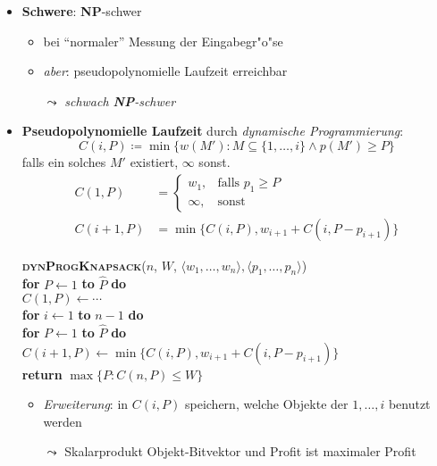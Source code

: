 \begin{itemize}
\begin{center}
  \end{center}
  \item \textbf{Schwere}: \textbf{NP}-schwer
  \begin{itemize}
    \item bei ``normaler'' Messung der Eingabegr"o"se
    \item \emph{aber}: pseudopolynomielle Laufzeit erreichbar
    \item[$ \leadsto $] \emph{schwach \textbf{NP}-schwer}
  \end{itemize}
  \item \textbf{Pseudopolynomielle Laufzeit} durch \emph{dynamische Programmierung}:
  \begin{equation*}
    C(i,P) \coloneqq \min\{ w(M') : M \subseteq \{ 1, \dots, i \} \wedge p(M') \geq P \}
  \end{equation*}
  falls ein solches $ M' $ existiert, $ \infty $ sonst.
  \begin{align*}
    C(1,P) &= \begin{cases}
      w_1, &\text{falls } p_1 \geq P \\
      \infty, &\text{sonst}
    \end{cases} \\
    C(i+1, P) &= \min\{ C(i,P), w_{i+1}+C(i,P-p_{i+1}) \}
  \end{align*}
  \begin{pseudocode}
    \textsc{\textbf{dynProgKnapsack}}($ n $, $ W $, $ \langle w_1, \dots, w_n \rangle, \langle p_1, \dots, p_n \rangle $) \\
    \textbf{for} $ P \leftarrow 1 $ \textbf{to} $ \hat{P} $ \textbf{do} \\
    \phantom{\quad} $ C(1,P) \leftarrow \cdots $ \\
    \textbf{for} $ i \leftarrow 1 $ \textbf{to} $ n - 1 $ \textbf{do} \\
    \phantom{\quad} \textbf{for} $ P \leftarrow 1 $ \textbf{to} $ \hat{P} $ \textbf{do} \\
    \phantom{\quad} \phantom{\quad} $ C(i+1, P) \leftarrow \min\{ C(i,P), w_{i+1}+C(i,P-p_{i+1}) \} $ \\
    \textbf{return} $ \max\{ P : C(n,P) \leq W \} $
  \end{pseudocode}
  \begin{itemize}
    \item \emph{Erweiterung}: in $ C(i,P) $ speichern, welche Objekte der $ 1,\dots,i $ benutzt werden
    \item[$ \leadsto $] Skalarprodukt Objekt-Bitvektor und Profit ist maximaler Profit
  \end{itemize}
\end{itemize}

